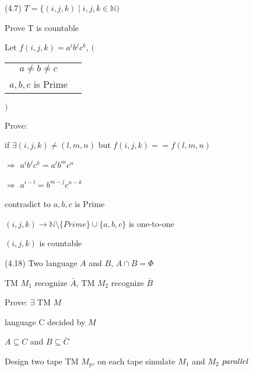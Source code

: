 \documentclass{article}
\begin{document}
\hspace{0.5cm}(4.7) $T = \{(i, j, k) \mid i, j, k \in \mathbb{N})$

\hspace{1.5cm} Prove T is countable

\vspace{5mm}

\hspace{0.5cm}Let $f(i, j, k) = a^ib^jc^k$, \hspace{0.25cm} $\Bigg($
\begin{tabular}{cc}
  $a \not= b \not= c$ \\
  $a, b, c$ is Prime
  \end{tabular} 
$\Bigg)$

\hspace{0.5cm}Prove:

\hspace{0.5cm}if $\exists (i, j, k) \not= (l, m, n)$ but $f(i, j, k) == f(l, m, n)$

\hspace{0.5cm}$\Rightarrow$ $a^ib^jc^k = a^lb^mc^n$

\hspace{0.5cm}$\Rightarrow$ $a^{i-l} = b^{m-j}c^{n-k}$

\hspace{0.5cm} contradict to $a, b, c$ is Prime

\hspace{0.5cm} $(i, j, k) \to \mathbb{N}\setminus\{Prime\}\cup\{a, b, c\}$ is one-to-one

\hspace{0.5cm} $(i, j, k)$ is countable

\vspace{5mm}

\hspace{0.5cm}(4.18) Two language $A$ and $B$, $A \cap B = \Phi$

\hspace{1.75cm} TM $M_1$ recognize $\bar{A}$, TM $M_2$ recognize $\bar{B}$

\hspace{1.75cm} Prove: $\exists$ TM $M$

\hspace{2cm} language C decided by $M$

\hspace{2cm} $A \subseteq C$ and $B \subseteq \bar{C}$

\vspace{5mm}

\hspace{0.5cm} Design two tape TM $M_p$, on each tape simulate $M_1$ and $M_2$ $\emph{parallel}$
 
\end{document}
